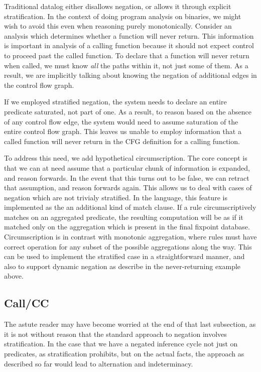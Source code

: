 Traditional datalog either disallows negation, or allows it through explicit stratification.
In the context of doing program analysis on binaries, we might wish to avoid this even when reasoning purely monotonically.
Consider an analysis which determines whether a function will never return.
This information is important in analysis of a calling function because it should not expect control to proceed past the called function.
To declare that a function will never return when called, we must know \emph{all} the paths within it, not just some of them.
As a result, we are implicitly talking about knowing the negation of additional edges in the control flow graph.

If we employed stratified negation, the system needs to declare an entire predicate saturated, not part of one.
As a result, to reason based on the absence of any control flow edge, the system would need to assume saturation of the entire control flow graph.
This leaves us unable to employ information that a called function will never return in the CFG definition for a calling function.

To address this need, we add hypothetical circumscription.
The core concept is that we can at need assume that a particular chunk of information is expanded, and reason forwards.
In the event that this turns out to be false, we can retract that assumption, and reason forwards again.
This allows us to deal with cases of negation which are not trivialy stratified.
In the language, this feature is implemented as the an additional kind of match clause.
If a rule circumscriptively matches on an aggregated predicate, the resulting computation will be as if it matched only on the aggregation which is present in the final fixpoint database.
Circumscription is in contrast with monotonic aggregation, where rules must have correct operation for any subset of the possible aggregations along the way.
This can be used to implement the stratified case in a straightforward manner, and also to support dynamic negation as describe in the never-returning example above.

\subsection{Call/CC}
\label{sec:motive-callcc}
The astute reader may have become worried at the end of that last subsection, as it is not without reason that the standard approach to negation involves stratification.
In the case that we have a negated inference cycle not just on predicates, as stratification prohibits, but on the actual facts, the approach as described so far would lead to alternation and indeterminacy.

